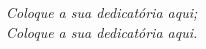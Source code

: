 \begin{dedicatoria}
   \vspace*{\fill}
   \centering
   \noindent
   \textit{ Coloque a sua dedicatória aqui;\\
   Coloque a sua dedicatória aqui.}
   \vspace*{\fill}
\end{dedicatoria}
